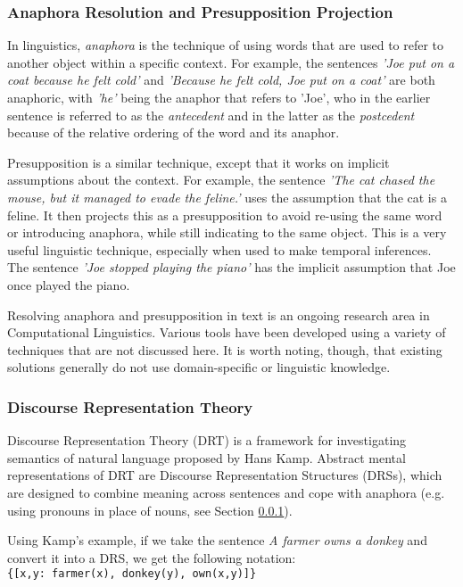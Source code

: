 \subsubsection{Anaphora Resolution and Presupposition Projection}
\label{sec:arback}
In linguistics, \textit{anaphora} is the technique of using words that are used to refer to another object within a specific context. For example, the sentences \textit{'Joe put on a coat because he felt cold'} and \textit{'Because he felt cold, Joe put on a coat'} are both anaphoric, with \textit{'he'} being the anaphor that refers to 'Joe', who in the earlier sentence is referred to as the \textit{antecedent} and in the latter as the \textit{postcedent} because of the relative ordering of the word and its anaphor.

Presupposition is a similar technique, except that it works on implicit assumptions about the context. For example, the sentence \textit{'The cat chased the mouse, but it managed to evade the feline.'} uses the assumption that the cat is a feline. It then projects this as a presupposition to avoid re-using the same word or introducing anaphora, while still indicating to the same object. This is a very useful linguistic technique, especially when used to make temporal inferences. The sentence \textit{'Joe stopped playing the piano'} has the implicit assumption that Joe once played the piano.

Resolving anaphora and presupposition in text is an ongoing research area in Computational Linguistics. Various tools have been developed using a variety of techniques that are not discussed here. It is worth noting, though, that existing solutions generally do not use domain-specific or linguistic knowledge.

\subsubsection{Discourse Representation Theory}
\label{sec:drt}
Discourse Representation Theory (DRT)\cite{kamp1993discourse} is a framework for investigating semantics of natural language proposed by Hans Kamp. Abstract mental representations of DRT are Discourse Representation Structures (DRSs), which are designed to combine meaning across sentences and cope with anaphora (e.g. using pronouns in place of nouns, see Section \ref{sec:arback}). 

Using Kamp's example, if we take the sentence \textit{A farmer owns a donkey} and convert it into a DRS, we get the following notation:\\
\texttt{\{[x,y: farmer(x), donkey(y), own(x,y)]\}}

